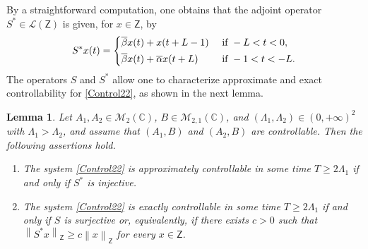 \documentclass[JEP,XML,SOM,Unicode]{cedram}
\theoremstyle{plain}
\newtheorem{lemm}[theo]{Lemma}
\theoremstyle{definition}
\newcommand{\norm}[1]{\left\lVert #1\right\lVert}
\begin{document}
By a straightforward computation, one obtains that the adjoint operator $S^\ast \in \mathcal L(\mathsf Z)$ is given, for $x \in \mathsf Z$, by
\begin{equation}
\label{SAst}
S^\ast x(t) =
\begin{dcases}
\overline\beta x(t) + x(t + L - 1) & \text{ if } -L < t < 0, \\
\overline\beta x(t) + \overline\alpha x(t + L) & \text{ if } -1 < t < -L.
\end{dcases}
\end{equation}
The operators $S$ and $S^\ast$ allow one to characterize approximate and exact controllability for \eqref{Control22}, as shown in the next lemma.

\begin{lemm}
\label{LemmS}
Let $A_1, A_2 \in \mathcal M_2(\mathbb C)$, $B \in \mathcal M_{2, 1}(\mathbb C)$, and $(\Lambda_1, \Lambda_2) \in (0, +\infty)^2$ with $\Lambda_1 > \Lambda_2$, and assume that $(A_1, B)$ and $(A_2, B)$ are controllable. Then the following assertions hold.
\begin{enumerate}
\item\label{Syst22SInj} The system \eqref{Control22} is approximately controllable in some time $T \geq 2 \Lambda_1$ if and only if $S^\ast$ is injective.

\item\label{Syst22SAstSurj} The system \eqref{Control22} is exactly controllable in some time $T \geq 2 \Lambda_1$ if and only if $S$ is surjective or, equivalently, if there exists $c > 0$ such that $\norm{S^\ast x}_{\mathsf Z} \geq c \norm{x}_{\mathsf Z}$ for every $x \in \mathsf Z$.
\end{enumerate}
\end{lemm}
\end{document}
